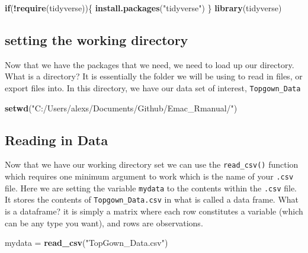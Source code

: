 \documentclass[
]{book}
\newenvironment{Shaded}{\begin{snugshade}}{\end{snugshade}}
\newcommand{\ControlFlowTok}[1]{\textcolor[rgb]{0.13,0.29,0.53}{\textbf{#1}}}
\newcommand{\KeywordTok}[1]{\textcolor[rgb]{0.13,0.29,0.53}{\textbf{#1}}}
\newcommand{\NormalTok}[1]{#1}
\newcommand{\OperatorTok}[1]{\textcolor[rgb]{0.81,0.36,0.00}{\textbf{#1}}}
\newcommand{\StringTok}[1]{\textcolor[rgb]{0.31,0.60,0.02}{#1}}
\begin{document}
\begin{Shaded}
\begin{Highlighting}[]
\ControlFlowTok{if}\NormalTok{(}\OperatorTok{!}\KeywordTok{require}\NormalTok{(tidyverse))\{}
    \KeywordTok{install.packages}\NormalTok{(}\StringTok{"tidyverse"}\NormalTok{)}
\NormalTok{\}}
\KeywordTok{library}\NormalTok{(tidyverse) }
\end{Highlighting}
\end{Shaded}

\hypertarget{setting-the-working-directory}{%
\subsection{setting the working directory}\label{setting-the-working-directory}}

Now that we have the packages that we need, we need to load up our directory. What is a directory? It is essentially the folder we will be using to read in files, or export files into. In this directory, we have our data set of interest, \texttt{Topgown\_Data}

\begin{Shaded}
\begin{Highlighting}[]
\KeywordTok{setwd}\NormalTok{(}\StringTok{"C:/Users/alexs/Documents/Github/Emac_Rmanual/"}\NormalTok{)}
\end{Highlighting}
\end{Shaded}

\hypertarget{reading-in-data}{%
\subsection{Reading in Data}\label{reading-in-data}}

Now that we have our working directory set we can use the \texttt{read\_csv()} function which requires one minimum argument to work which is the name of your \texttt{.csv} file. Here we are setting the variable \texttt{mydata} to the contents within the \texttt{.csv} file. It stores the contents of \texttt{Topgown\_Data.csv} in what is called a data frame. What is a dataframe? it is simply a matrix where each row constitutes a variable (which can be any type you want), and rows are observations.

\begin{Shaded}
\begin{Highlighting}[]
\NormalTok{mydata =}\StringTok{ }\KeywordTok{read_csv}\NormalTok{(}\StringTok{"TopGown_Data.csv"}\NormalTok{)}
\end{Highlighting}
\end{Shaded}
\end{document}
